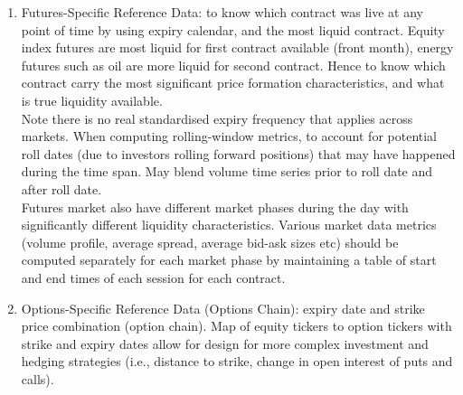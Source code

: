 \documentclass[a4paper,oneside,openany]{book}
\begin{document}
\begin{definition}
\begin{enumerate}[label=\roman*.]
\begin{enumerate}[label=\arabic*.]
\setlength{\itemsep}{0pt}
\item Half trading days preceding Christmas and following thanksgiving in US
\item Ramandan even in Turkey
\item Taiwan market opening on weekend to make up for lost trading days during holiday periods
\item Korean market changing trading hours on day of nationwide university entrance exam
\item Brazilian market opening late on day following the Carnival
\item Last trading days of months and quarters (investors rebalance portfolios)
\item Index rebalancing dates, where intraday volume distribution is significantly skewed toward EODs
\item Options and futures expiry dates (quarterly/monthly expiry, Triple Witching in US, Special Quotations in Japan) where excess trading volume and different intraday patterns result from hedging activity and portfolio adjustments.
\end{enumerate}
Model normal days first. Special days are modelled either independently, or using normal days as baseline.
\item Futures-Specific Reference Data: to know which contract was live at any point of time by using expiry calendar, and the most liquid contract. Equity index futures are most liquid for first contract available (front month), energy futures such as oil are more liquid for second contract. Hence to know which contract carry the most significant price formation characteristics, and what is true liquidity available.\\
Note there is no real standardised expiry frequency that applies across markets. When computing rolling-window metrics, to account for potential roll dates (due to investors rolling forward positions) that may have happened during the time span. May blend volume time series prior to roll date and after roll date.\\
Futures market also have different market phases during the day with significantly different liquidity characteristics. Various market data metrics (volume profile, average spread, average bid-ask sizes etc) should be computed separately for each market phase by maintaining a table of start and end times of each session for each contract.
\item Options-Specific Reference Data (Options Chain): expiry date and strike price combination (option chain). Map of equity tickers to option tickers with strike and expiry dates allow for design for more complex investment and hedging strategies (i.e., distance to strike, change in open interest of puts and calls).

\end{enumerate}
\end{definition}
\end{document}
